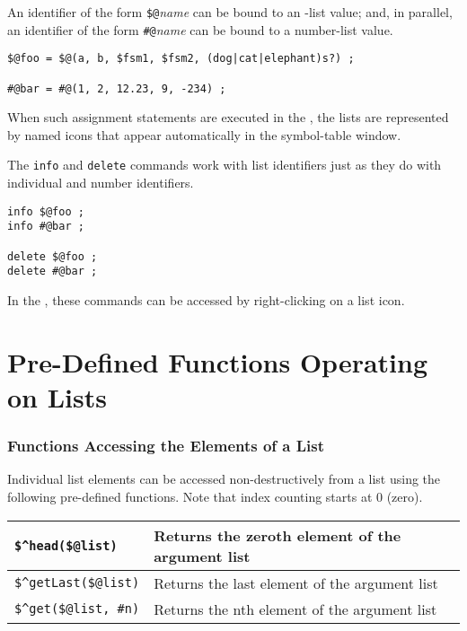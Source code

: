 \noindent
An identifier of the form \verb!$@!\emph{name} can be bound to an
\fsm{}-list value; and, in parallel, an identifier of the form
\verb!#@!\emph{name} can be bound to a number-list value.

\begin{Verbatim}
$@foo = $@(a, b, $fsm1, $fsm2, (dog|cat|elephant)s?) ;

#@bar = #@(1, 2, 12.23, 9, -234) ;
\end{Verbatim}

\noindent
When such assignment statements are executed in the , the lists are
represented by named icons that appear automatically in the symbol-table window.

The \texttt{info} and \texttt{delete} commands work with list identifiers
just as they do with individual \fsm{} and number identifiers.

\begin{Verbatim}
info $@foo ;
info #@bar ;

delete $@foo ;
delete #@bar ;
\end{Verbatim}

\noindent
In the , these commands can be accessed by right-clicking on a list
icon.

\section{Pre-Defined Functions Operating on Lists}

\subsubsection{Functions Accessing the Elements of a List} 
Individual list
elements can be accessed non-destructively from a list using the
following pre-defined functions.  Note that index counting starts at 0
(zero).

\vspace{.5cm}

\noindent
\begin{tabular}{|l|l|}
\hline
\verb!$^head($@list)! & Returns the zeroth \fsm{} element of the argument list\\
\hline
\verb!$^getLast($@list)! & Returns the last \fsm{} element of the argument list\\
\hline
\verb!$^get($@list, #n)! & Returns the nth \fsm{} element of the argument list\\
\hline
\end{tabular}

